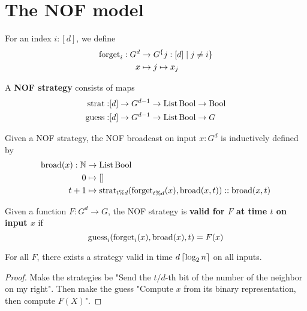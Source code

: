 \chapter{The NOF model}

\begin{definition}
  \label{def:forget}

  For an index $i : [d]$, we define
  \begin{align}
    \operatorname{forget}_i : G^d & \to G^\{j : [d] \mid j \ne i\} \\
    x & \mapsto j \mapsto x_j
  \end{align}
\end{definition}

\begin{definition}
  \label{def:strategy}

  A {\bf NOF strategy} consists of maps
  \begin{align}
    \operatorname{strat} : & [d] \to G^{d - 1} \to \operatorname{List} \operatorname{Bool} \to \operatorname{Bool} \\
    \operatorname{guess} : & [d] \to G^{d - 1} \to \operatorname{List} \operatorname{Bool} \to G
  \end{align}
\end{definition}

\begin{definition}
  \label{def:broadcast}

  Given a NOF strategy, the NOF broadcast on input $x : G^d$ is inductively defined by
  \begin{align}
    \operatorname{broad}(x) : \mathbb{N} & \to \operatorname{List} \operatorname{Bool} \\
    0 & \mapsto [] \\
    t + 1 & \mapsto \operatorname{strat}_{t \% d}(\operatorname{forget}_{t \% d}(x), \operatorname{broad}(x, t)) :: \operatorname{broad}(x, t)
  \end{align}
\end{definition}

\begin{definition}
  \label{def:valid-strategy}

  Given a function $F : G^d \to G$, the NOF strategy is {\bf valid for $F$ at time $t$ on input $x$} if
  $$\operatorname{guess}_i(\operatorname{forget}_i(x), \operatorname{broad}(x), t) = F(x)$$
\end{definition}

\begin{lemma}
  \label{lem:eventually-valid-strategy}

  For all $F$, there exists a strategy valid in time $d\left\lceil \log_2 n\right\rceil$ on all inputs.
\end{lemma}
\begin{proof}

  Make the strategies be "Send the $t / d$-th bit of the number of the neighbor on my right". Then make the guess "Compute $x$ from its binary representation, then compute $F(X)$".
\end{proof}

